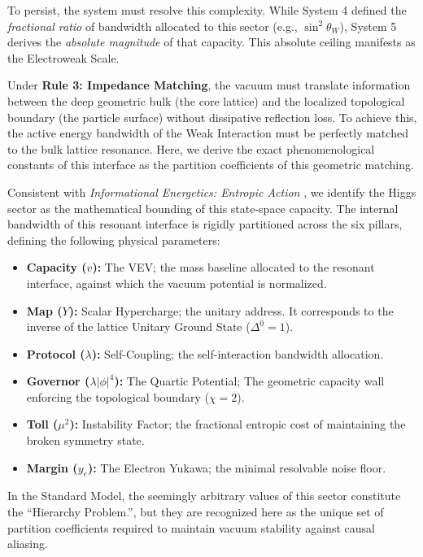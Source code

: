 To persist, the system must resolve this complexity. While System 4 defined the \textit{fractional ratio} of bandwidth allocated to this sector (e.g., $\sin^2\theta_W$), System 5 derives the \textit{absolute magnitude} of that capacity. This absolute ceiling manifests as the Electroweak Scale.

Under \textbf{Rule 3: Impedance Matching}, the vacuum must translate information between the deep geometric bulk (the core lattice) and the localized topological boundary (the particle surface) without dissipative reflection loss. To achieve this, the active energy bandwidth of the Weak Interaction must be perfectly matched to the bulk lattice resonance. Here, we derive the exact phenomenological constants of this interface as the partition coefficients of this geometric matching.

Consistent with \textit{Informational Energetics: Entropic Action} \cite{meyer_ieaction_2026}, we identify the Higgs sector as the mathematical bounding of this state-space capacity. The internal bandwidth of this resonant interface is rigidly partitioned across the six pillars, defining the following physical parameters:

\begin{itemize}
    \item \textbf{Capacity ($v$):} The VEV; the mass baseline allocated to the resonant interface, against which the vacuum potential is normalized.
    \item \textbf{Map ($Y$):} Scalar Hypercharge; the unitary address. It corresponds to the inverse of the lattice Unitary Ground State ($\Delta^0=1$).
    \item \textbf{Protocol ($\lambda$):} Self-Coupling; the self-interaction bandwidth allocation.
    \item \textbf{Governor ($\lambda|\phi|^4$):} The Quartic Potential; The geometric capacity wall enforcing the topological boundary ($\chi=2$).
    \item \textbf{Toll ($\mu^2$):} Instability Factor; the fractional entropic cost of maintaining the broken symmetry state.
    \item \textbf{Margin ($y_e$):} The Electron Yukawa; the minimal resolvable noise floor.
\end{itemize}

In the Standard Model, the seemingly arbitrary values of this sector constitute the ``Hierarchy Problem.'', but they are recognized here as the unique set of partition coefficients required to maintain vacuum stability against causal aliasing.

